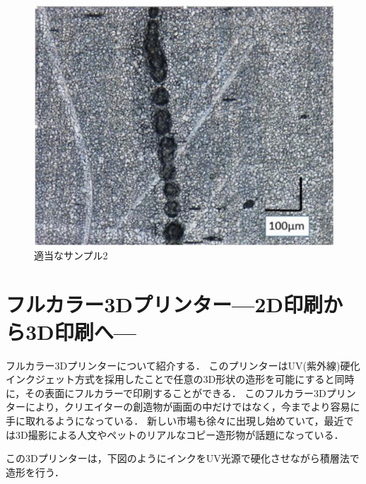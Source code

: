 \begin{figure}[H]
  \centering
  \includegraphics[width=9truecm]{./fig/静電インクジェット2.jpg}
  \caption{適当なサンプル2}
  \label{fig:ferret}
\end{figure}


\section{フルカラー3Dプリンター—2D印刷から3D印刷へ—\cite{f}}
\label{sec:enum}
フルカラー3Dプリンターについて紹介する．
このプリンターはUV(紫外線)硬化インクジェット方式を採用したことで任意の3D形状の造形を可能にすると同時に，その表面にフルカラーで印刷することができる．
このフルカラー3Dプリンターにより，クリエイターの創造物が画面の中だけではなく，今までより容易に手に取れるようになっている．
新しい市場も徐々に出現し始めていて，最近では3D撮影による人文やペットのリアルなコピー造形物が話題になっている．

この3Dプリンターは，下図のようにインクをUV光源で硬化させながら積層法で造形を行う．

